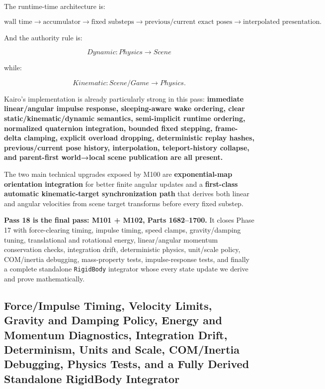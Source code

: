 The runtime-time architecture is:

\[
\boxed{
\text{wall time}
\rightarrow
\text{accumulator}
\rightarrow
\text{fixed substeps}
\rightarrow
\text{previous/current exact poses}
\rightarrow
\text{interpolated presentation}.
}
\]

And the authority rule is:

\[
\boxed{
Dynamic:
Physics\rightarrow Scene
}
\]

while:

\[
\boxed{
Kinematic:
Scene/Game\rightarrow Physics.
}
\]

Kairo's implementation is already particularly strong in this pass: \textbf{immediate linear/angular impulse response, sleeping-aware wake ordering, clear static/kinematic/dynamic semantics, semi-implicit runtime ordering, normalized quaternion integration, bounded fixed stepping, frame-delta clamping, explicit overload dropping, deterministic replay hashes, previous/current pose history, interpolation, teleport-history collapse, and parent-first world→local scene publication are all present.}

The two main technical upgrades exposed by M100 are \textbf{exponential-map orientation integration} for better finite angular updates and a \textbf{first-class automatic kinematic-target synchronization path} that derives both linear and angular velocities from scene target transforms before every fixed substep.

\textbf{Pass 18 is the final pass: M101 + M102, Parts 1682--1700.} It closes Phase 17 with force-clearing timing, impulse timing, speed clamps, gravity/damping tuning, translational and rotational energy, linear/angular momentum conservation checks, integration drift, deterministic physics, unit/scale policy, COM/inertia debugging, mass-property tests, impulse-response tests, and finally a complete standalone \texttt{RigidBody} integrator whose every state update we derive and prove mathematically.

\subsection{Force/Impulse Timing, Velocity Limits, Gravity and Damping Policy, Energy and Momentum Diagnostics, Integration Drift, Determinism, Units and Scale, COM/Inertia Debugging, Physics Tests, and a Fully Derived Standalone RigidBody Integrator}\label{06-engine-ii-ch038-forceimpulse-timing-velocity-limits-gravity-and-damping-policy-energy-and-momentum-diagnostics-integration-drift-determinism-units-and-scale-cominertia-debugging-physics-tests-and-a-fully-derived-standalone-rigidbody-integrator}

